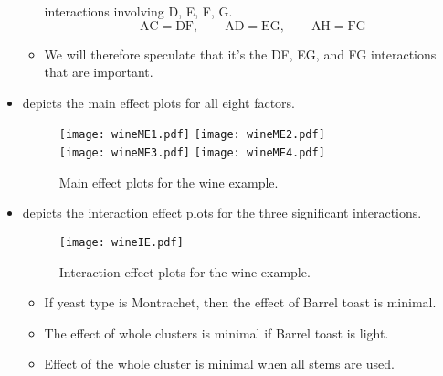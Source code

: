 \begin{itemize}
\begin{itemize}[*]
                        interactions involving D, E, F, G.
                        \[ \text{AC}=\text{DF},\qquad\text{AD}=\text{EG},\qquad\text{AH}=\text{FG} \]
                  \item We will therefore speculate that it's the DF, EG, and FG interactions that are important.
            \end{itemize}
      \item {} depicts the main effect plots for all eight factors.
            \begin{figure}[!htbp]
                  \centering
                  \texttt{[image: wineME1.pdf]}\hfill
                  \texttt{[image: wineME2.pdf]}
                  \\[\smallskipamount]
                  \texttt{[image: wineME3.pdf]}\hfill
                  \texttt{[image: wineME4.pdf]}
                  \caption{Main effect plots for the wine example.}\label{fig:wineME}
            \end{figure}
      \item {} depicts the interaction effect plots for the three significant interactions.
            \begin{figure}[!htbp]
                  \centering
                  \texttt{[image: wineIE.pdf]}
                  \caption{Interaction effect plots for the wine example.}\label{fig:wineIE}
            \end{figure}
            \begin{itemize}
                  \item If yeast type is Montrachet, then the effect of Barrel toast is minimal.
                  \item The effect of whole clusters is minimal if Barrel toast is light.
                  \item Effect of the whole cluster is minimal when all stems are used.
            \end{itemize}
\end{itemize}

